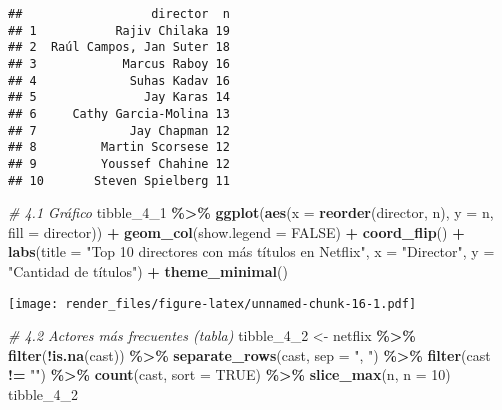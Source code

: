 \documentclass[
]{article}
\newenvironment{Shaded}{\begin{snugshade}}{\end{snugshade}}
\newcommand{\AttributeTok}[1]{\textcolor[rgb]{0.13,0.29,0.53}{#1}}
\newcommand{\CommentTok}[1]{\textcolor[rgb]{0.56,0.35,0.01}{\textit{#1}}}
\newcommand{\ConstantTok}[1]{\textcolor[rgb]{0.56,0.35,0.01}{#1}}
\newcommand{\DecValTok}[1]{\textcolor[rgb]{0.00,0.00,0.81}{#1}}
\newcommand{\FunctionTok}[1]{\textcolor[rgb]{0.13,0.29,0.53}{\textbf{#1}}}
\newcommand{\NormalTok}[1]{#1}
\newcommand{\OtherTok}[1]{\textcolor[rgb]{0.56,0.35,0.01}{#1}}
\newcommand{\SpecialCharTok}[1]{\textcolor[rgb]{0.81,0.36,0.00}{\textbf{#1}}}
\newcommand{\StringTok}[1]{\textcolor[rgb]{0.31,0.60,0.02}{#1}}
\begin{document}
\begin{verbatim}
##                  director  n
## 1           Rajiv Chilaka 19
## 2  Raúl Campos, Jan Suter 18
## 3            Marcus Raboy 16
## 4             Suhas Kadav 16
## 5               Jay Karas 14
## 6     Cathy Garcia-Molina 13
## 7             Jay Chapman 12
## 8         Martin Scorsese 12
## 9         Youssef Chahine 12
## 10       Steven Spielberg 11
\end{verbatim}

\begin{Shaded}
\begin{Highlighting}[]
\CommentTok{\# 4.1 Gráfico}
\NormalTok{tibble\_4\_1 }\SpecialCharTok{\%\textgreater{}\%}
  \FunctionTok{ggplot}\NormalTok{(}\FunctionTok{aes}\NormalTok{(}\AttributeTok{x =} \FunctionTok{reorder}\NormalTok{(director, n), }\AttributeTok{y =}\NormalTok{ n, }\AttributeTok{fill =}\NormalTok{ director)) }\SpecialCharTok{+}
  \FunctionTok{geom\_col}\NormalTok{(}\AttributeTok{show.legend =} \ConstantTok{FALSE}\NormalTok{) }\SpecialCharTok{+}
  \FunctionTok{coord\_flip}\NormalTok{() }\SpecialCharTok{+}
  \FunctionTok{labs}\NormalTok{(}\AttributeTok{title =} \StringTok{"Top 10 directores con más títulos en Netflix"}\NormalTok{,}
       \AttributeTok{x =} \StringTok{"Director"}\NormalTok{, }\AttributeTok{y =} \StringTok{"Cantidad de títulos"}\NormalTok{) }\SpecialCharTok{+}
  \FunctionTok{theme\_minimal}\NormalTok{()}
\end{Highlighting}
\end{Shaded}

\texttt{[image: render\_files/figure-latex/unnamed-chunk-16-1.pdf]}

\begin{Shaded}
\begin{Highlighting}[]
\CommentTok{\# 4.2 Actores más frecuentes (tabla)}
\NormalTok{tibble\_4\_2 }\OtherTok{\textless{}{-}}\NormalTok{ netflix }\SpecialCharTok{\%\textgreater{}\%}
  \FunctionTok{filter}\NormalTok{(}\SpecialCharTok{!}\FunctionTok{is.na}\NormalTok{(cast)) }\SpecialCharTok{\%\textgreater{}\%}
  \FunctionTok{separate\_rows}\NormalTok{(cast, }\AttributeTok{sep =} \StringTok{", "}\NormalTok{) }\SpecialCharTok{\%\textgreater{}\%}
  \FunctionTok{filter}\NormalTok{(cast }\SpecialCharTok{!=} \StringTok{""}\NormalTok{) }\SpecialCharTok{\%\textgreater{}\%}
  \FunctionTok{count}\NormalTok{(cast, }\AttributeTok{sort =} \ConstantTok{TRUE}\NormalTok{) }\SpecialCharTok{\%\textgreater{}\%}
  \FunctionTok{slice\_max}\NormalTok{(n, }\AttributeTok{n =} \DecValTok{10}\NormalTok{)}
\NormalTok{tibble\_4\_2}
\end{Highlighting}
\end{Shaded}
\end{document}
